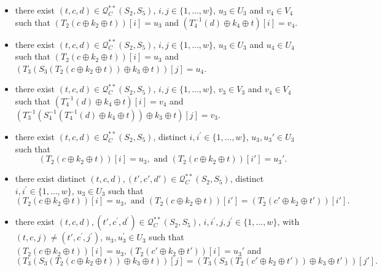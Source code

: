 \begin{itemize}
  \item[\hone]
  there exist $(t, c, d) \in \mathcal{Q}_{C}^{**}\left(S_{2}, S_{5}\right)$, $i, j \in\{1, \ldots, w\}$, $u_{3} \in U_{3}$ and $v_{4} \in V_{4}$ such that $\left(T_2\left(c \oplus k_{2} \oplus t\right)\right)[i] = u_3$ and $\left(T_{4}^{-1}\left(d \right) \oplus k_{4} \oplus t\right)[i] = v_4$.
  \item[\htwo]
  there exist $(t, c, d) \in \mathcal{Q}_{C}^{**}\left(S_{2}, S_{5}\right)$, $i, j \in\{1, \ldots, w\}$, $u_{3} \in U_{3}$ and $u_{4} \in U_{4}$ such that $\left(T_2\left(c \oplus k_{2} \oplus t\right)\right)[i] = u_3$ and $\left(T_{3}\left(S_{3}\left(T_2\left(c \oplus k_{2} \oplus t\right)\right) \oplus k_{3} \oplus t\right)\right)[j] = u_4$.
  \item[\hthree]
  there exist $(t, c, d) \in \mathcal{Q}_{C}^{**}\left(S_{2}, S_{5}\right)$, $i, j \in\{1, \ldots, w\}$, $v_{3} \in V_{3}$ and $v_{4} \in V_{4}$ such that $\left(T_{4}^{-1}\left(d \right) \oplus k_{4} \oplus t\right)[i] = v_4$ and $\left(T_{3}^{-1}\left(S_{4}^{-1}\left(T_{4}^{-1}\left(d\right) \oplus k_{4} \oplus t\right)\right) \oplus k_{3} \oplus t\right)[j] = v_3$.
  \item[\hfour]
  there exist $(t, c, d) \in \mathcal{Q}_{C}^{**}\left(S_{2}, S_{5}\right)$, distinct $i, i^{\prime}\in\{1, \ldots, w\}$, $u_{3},u_{3}' \in U_{3}$ such that
  $$\left(T_2\left(c \oplus k_{2} \oplus t\right)\right)[i] = u_3,\text{ and }
  \left(T_2\left(c \oplus k_{2} \oplus t\right)\right)[i'] = u_3'.$$
  \item[\hfive]
  there exist distinct $(t, c, d),(t', c', d') \in \mathcal{Q}_{C}^{**}\left(S_{2}, S_{5}\right)$, distinct $i, i^{\prime}\in\{1, \ldots, w\}$, $u_{3} \in U_{3}$ such that
  $$\left(T_2\left(c \oplus k_{2} \oplus t\right)\right)[i] = u_3,\text{ and }
  \left(T_2\left(c \oplus k_{2} \oplus t\right)\right)[i'] =\left(T_2\left(c' \oplus k_{2} \oplus t'\right)\right)[i'].$$
  \item[\hsix]
  there exist $(t, c, d), (t', c^{\prime}, d^{\prime}) \in \mathcal{Q}_{C}^{**}\left(S_{2}, S_{5}\right)$, $i, i^{\prime},j, j^{\prime} \in\{1, \ldots, w\}$, with$(t, c, j) \neq \left(t', c^{\prime}, j^{\prime}\right)$, $u_{3}, u_{3}^{\prime} \in U_{3}$ such that $\left(T_2\left(c \oplus k_{2} \oplus t\right)\right)[i] = u_3,\left(T_2\left(c' \oplus k_{2} \oplus t'\right)\right)[i] = u_3'$ and
$$
  \left(T_{3}\left(S_{3}\left(T_2\left(c \oplus k_{2} \oplus t\right)\right) \oplus k_{3} \oplus t\right)\right)[j] = \left(T_{3}\left(S_{3}\left(T_2\left(c' \oplus k_{2} \oplus t'\right)\right) \oplus k_{3} \oplus t'\right)\right)[j'].
$$
\end{itemize}
